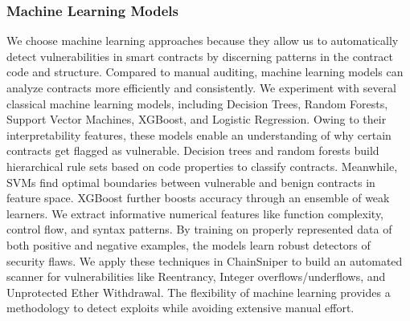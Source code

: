 \documentclass[sigconf]{acmart}
\begin{document}
\subsubsection{Machine Learning Models}
We choose machine learning approaches because they allow us to automatically detect vulnerabilities in smart contracts by discerning patterns in the contract code and structure. Compared to manual auditing, machine learning models can analyze contracts more efficiently and consistently. We experiment with several classical machine learning models, including Decision Trees, Random Forests, Support Vector Machines, XGBoost, and Logistic Regression. Owing to their interpretability features, these models enable an understanding of why certain contracts get flagged as vulnerable. Decision trees and random forests build hierarchical rule sets based on code properties to classify contracts. Meanwhile, SVMs find optimal boundaries between vulnerable and benign contracts in feature space. XGBoost further boosts accuracy through an ensemble of weak learners. We extract informative numerical features like function complexity, control flow, and syntax patterns. By training on properly represented data of both positive and negative examples, the models learn robust detectors of security flaws. We apply these techniques in ChainSniper to build an automated scanner for vulnerabilities like Reentrancy, Integer overflows/underflows, and Unprotected Ether Withdrawal. The flexibility of machine learning provides a methodology to detect exploits while avoiding extensive manual effort.
\end{document}
